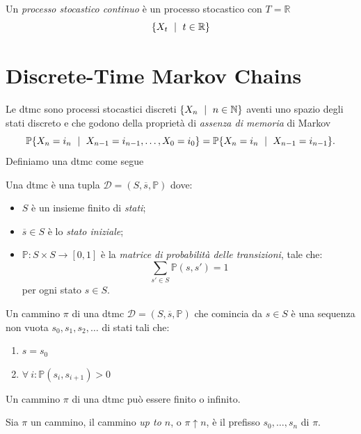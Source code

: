 \begin{mtdef}
	Un \emph{processo stocastico continuo} è un processo stocastico con $T = \mathbb{R}$
	$$ \{X_t \mbox{ }\mid\mbox{ } t \in \mathbb{R}\} $$
\end{mtdef}

\section{Discrete-Time Markov Chains}

Le \ac{dtmc} sono processi stocastici discreti $\{X_n \mbox{ }\mid\mbox{ } n \in \mathbb{N}\}$ aventi uno spazio degli stati discreto e che godono della proprietà di \emph{assenza di memoria} di Markov
$$ \mathbb{P}\{X_{n} = i_{n}\mbox{ }\mid\mbox{ } X_{n-1} = i_{n-1}, \dots, X_0=i_0 \} = \mathbb{P}\{X_{n} = i_{n}\mbox{ }\mid\mbox{ } X_{n-1} = i_{n-1}\}. $$
Definiamo una \ac{dtmc} come segue
\begin{mtdef}[\ac{dtmc}]
	Una \ac{dtmc} è una tupla $\mathcal{D} = (S,\overline{s},\mathbb{P})$ dove:
	\begin{itemize}
		\item $S$ è un insieme finito di \emph{stati};
		\item $\overline{s} \in S$ è lo \emph{stato iniziale};
		\item $\mathbb{P} : S \times S \rightarrow [0,1]$ è la \emph{matrice di probabilità delle transizioni}, tale che:
		$$ \sum_{s' \in S} \mathbb{P}(s,s') = 1$$
		per ogni stato $s \in S$.
	\end{itemize}
\end{mtdef}

\begin{mtdef}
	Un cammino $\pi$ di una \ac{dtmc} $\mathcal{D} = (S,\overline{s}, \mathbb{P})$ che comincia da $s \in S$ è una sequenza non vuota $s_0, s_1, s_2, \dots$ di stati tali che:
	\begin{enumerate}
		\item $s = s_0$
		\item $\forall\ i : \mathbb{P}(s_i, s_{i+1}) > 0$
	\end{enumerate} 
\end{mtdef}

\begin{mtobs}
	Un cammino $\pi$ di una \ac{dtmc} può essere finito o infinito.
\end{mtobs}

\begin{mtdef}
	Sia $\pi$ un cammino, il cammino \emph{up to $n$}, o $\pi \uparrow n$, è il prefisso $s_0, \dots, s_n$ di $\pi$.
\end{mtdef}

